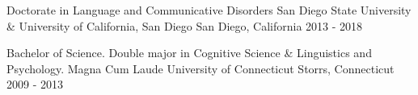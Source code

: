 
\begin{cventries}

  \iffalse %
  \cventry %
    {Degree}
    {Institution}
    {Location}
    {Mo. YEAR - Mo. YEAR} %
    {
      \begin{cvitems}
        \item {Description(s) bullet points}
      \end{cvitems}
    }
  \fi

  \cventry 
    {Doctorate in Language and Communicative Disorders} %
    {San Diego State University \& University of California, San Diego} %
    {San Diego, California} %
    {2013 - 2018} %
    {}

  \cventry 
    {Bachelor of Science. Double major in Cognitive Science \& Linguistics and Psychology. Magna Cum Laude} %
    {University of Connecticut} %
    {Storrs, Connecticut} %
    {2009 - 2013} %
    {} 

\end{cventries}
